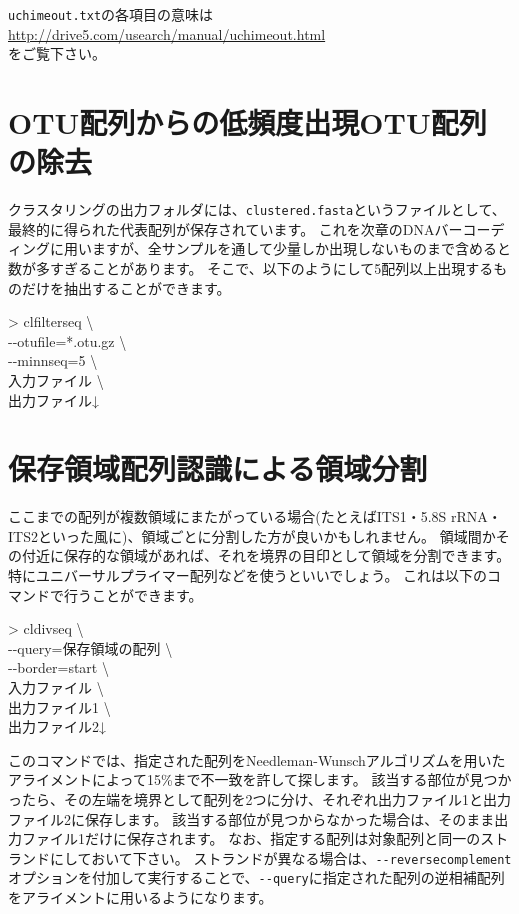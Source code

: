 \documentclass[titlepage,10pt,a4paper]{jsbook}
\newenvironment{cmd}{\begin{oframed}\raggedright\ttfamily\footnotesize\setlength{\baselineskip}{1.4em}}{\end{oframed}\vspace{-1em}}
\begin{document}
\texttt{uchimeout.txt}の各項目の意味は\\
\href{http://drive5.com/usearch/manual/uchimeout.html}{http://drive5.com/usearch/manual/uchimeout.html}\\
をご覧下さい。

\section{OTU配列からの低頻度出現OTU配列の除去}

クラスタリングの出力フォルダには、\texttt{clustered.fasta}というファイルとして、最終的に得られた代表配列が保存されています。
これを次章のDNAバーコーディングに用いますが、全サンプルを通して少量しか出現しないものまで含めると数が多すぎることがあります。
そこで、以下のようにして5配列以上出現するものだけを抽出することができます。

\begin{cmd}
{\textgreater} clfilterseq {\textbackslash}\\
{-}{-}otufile=*.otu.gz {\textbackslash}\\
{-}{-}minnseq=5 {\textbackslash}\\
入力ファイル {\textbackslash}\\
出力ファイル↓
\end{cmd}

\section{保存領域配列認識による領域分割}

ここまでの配列が複数領域にまたがっている場合(たとえばITS1・5.8S rRNA・ITS2といった風に)、領域ごとに分割した方が良いかもしれません。
領域間かその付近に保存的な領域があれば、それを境界の目印として領域を分割できます。
特にユニバーサルプライマー配列などを使うといいでしょう。
これは以下のコマンドで行うことができます。

\begin{cmd}
{\textgreater} cldivseq {\textbackslash}\\
{-}{-}query=保存領域の配列 {\textbackslash}\\
{-}{-}border=start {\textbackslash}\\
入力ファイル {\textbackslash}\\
出力ファイル1 {\textbackslash}\\
出力ファイル2↓
\end{cmd}

このコマンドでは、指定された配列をNeedleman-Wunschアルゴリズムを用いたアライメントによって15\%まで不一致を許して探します。
該当する部位が見つかったら、その左端を境界として配列を2つに分け、それぞれ出力ファイル1と出力ファイル2に保存します。
該当する部位が見つからなかった場合は、そのまま出力ファイル1だけに保存されます。
なお、指定する配列は対象配列と同一のストランドにしておいて下さい。
ストランドが異なる場合は、\texttt{{-}{-}reversecomplement}オプションを付加して実行することで、\texttt{{-}{-}query}に指定された配列の逆相補配列をアライメントに用いるようになります。
\end{document}
